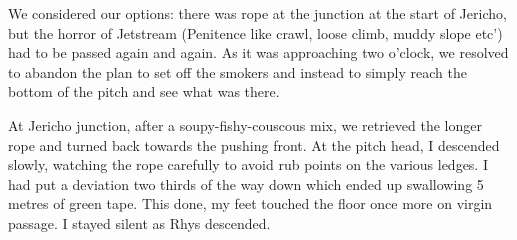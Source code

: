 We considered our options: there was rope at the junction at the start of Jericho, but the horror of Jetstream (Penitence like crawl, loose climb, muddy slope etc') had to be passed again and again.  As it was approaching two o'clock, we resolved to abandon the plan to set off the smokers and  instead to simply reach the bottom of the pitch and see what was there.

At Jericho junction, after a soupy-fishy-couscous mix, we retrieved the longer rope and turned back towards the pushing front. At the pitch head, I descended slowly, watching the rope carefully to avoid rub points on the various ledges. I had put a deviation two thirds of the way down which ended up swallowing 5 metres of green tape. This done, my feet touched the floor once more on virgin passage. I stayed silent as Rhys descended.

